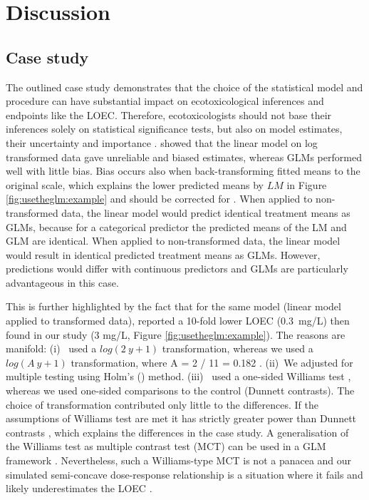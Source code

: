 \section{Discussion}
\label{sec:usetheglm:disc}
\subsection{Case study}
The outlined case study demonstrates that the choice of the statistical model and procedure can have substantial impact on ecotoxicological inferences and endpoints like the LOEC.
Therefore, ecotoxicologists should not base their inferences solely on statistical significance tests, but also on model estimates, their uncertainty and importance \citep{gelman_difference_2006}.
\citet{ohara_not_2010} showed that the linear model on log transformed data gave unreliable and biased estimates, whereas GLMs performed well with little bias.
Bias occurs also when back-transforming fitted means to the original scale, which explains the lower predicted means by $LM$ in Figure \ref{fig:usetheglm:example} \citep{rothery_cautionary_1988} and should be corrected for \citep{newman_regression_1993}.
When applied to non-transformed data, the linear model would predict identical treatment means as GLMs, because for a categorical predictor the predicted means of the LM and GLM are identical. 
When applied to non-transformed data, the linear model would result in identical predicted treatment means as GLMs. 
However, predictions would differ with continuous predictors and GLMs are particularly advantageous in this case.

This is further highlighted by the fact that for the same model (linear model applied to transformed data), \citet{brock_minimum_2015} reported a 10-fold lower LOEC (\mbox{0.3 mg/L}) then found in our study (3 mg/L, Figure \ref{fig:usetheglm:example}).
The reasons are manifold: 
(i)~\citet{brock_minimum_2015} used a $log(2~y + 1)$ transformation, whereas we used a $log(A~y + 1)$ transformation, where A = 2 / 11 = 0.182 \citep{van_den_brink_impact_2000}.
(ii)~We adjusted for multiple testing using Holm's (\citeyear{holm_simple_1979}) method.
(iii)~\citet{brock_minimum_2015} used a one-sided Williams test \citep{williams_comparison_1972}, whereas we used one-sided comparisons to the control (Dunnett contrasts).
The choice of transformation contributed only little to the differences. 
If the assumptions of Williams test  are met it has strictly greater power than Dunnett contrasts \citep{jaki_statistical_2013}, which explains the differences in the case study.
A generalisation of the Williams test as multiple contrast test (MCT) can be used in a GLM framework \citep{hothorn_simultaneous_2008}.
Nevertheless, such a Williams-type MCT is not a panacea \citep{hothorn_statistical_2014} and our simulated semi-concave dose-response relationship is a situation where it fails and likely underestimates the LOEC \citep{kuiper_identification_2014}. 
 

